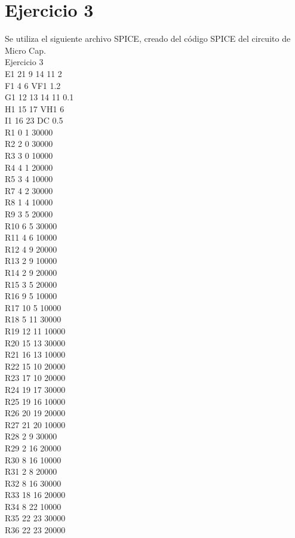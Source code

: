 \documentclass{article}
\begin{document}
\section{Ejercicio 3}
Se utiliza el siguiente archivo SPICE, creado del código SPICE del circuito de Micro Cap.\\
Ejercicio 3\\
E1 21 9 14 11 2\\
F1 4 6 VF1 1.2\\
G1 12 13 14 11 0.1\\
H1 15 17 VH1 {6}\\
I1 16 23 DC 0.5\\
R1 0 1 30000\\
R2 2 0 30000\\
R3 3 0 10000\\
R4 4 1 20000\\
R5 3 4 10000\\
R7 4 2 30000\\
R8 1 4 10000\\
R9 3 5 20000\\
R10 6 5 30000\\
R11 4 6 10000\\
R12 4 9 20000\\
R13 2 9 10000\\
R14 2 9 20000\\
R15 3 5 20000\\
R16 9 5 10000\\
R17 10 5 10000\\
R18 5 11 30000\\
R19 12 11 10000\\
R20 15 13 30000\\
R21 16 13 10000\\
R22 15 10 20000\\
R23 17 10 20000\\
R24 19 17 30000\\
R25 19 16 10000\\
R26 20 19 20000\\
R27 21 20 10000\\
R28 2 9 30000\\
R29 2 16 20000\\
R30 8 16 10000\\
R31 2 8 20000\\
R32 8 16 30000\\
R33 18 16 20000\\
R34 8 22 10000\\
R35 22 23 30000\\
R36 22 23 20000\\
\end{document}
